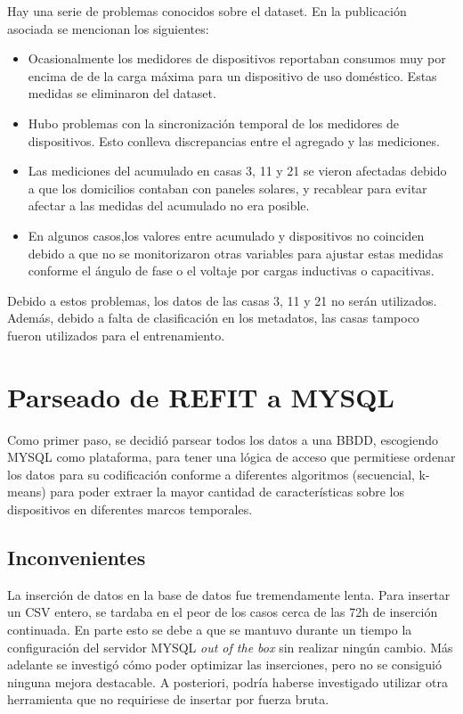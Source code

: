 Hay una serie de problemas conocidos sobre el dataset. En la publicación asociada se mencionan los siguientes:
\begin{itemize}
    \item Ocasionalmente los medidores de dispositivos reportaban consumos muy por encima de de la carga máxima para un dispositivo de uso doméstico. Estas medidas se eliminaron del dataset.
    \item Hubo problemas con la sincronización temporal de los medidores de dispositivos. Esto conlleva discrepancias entre el agregado y las mediciones.
    \item Las mediciones del acumulado en casas 3, 11 y 21 se vieron afectadas debido a que los domicilios contaban con paneles solares, y recablear para evitar afectar a las medidas del acumulado no era posible.
    \item En algunos casos,los valores entre acumulado y dispositivos no coinciden debido a que no se monitorizaron otras variables para ajustar estas medidas conforme el ángulo de fase o el voltaje por cargas inductivas o capacitivas.
\end{itemize}

Debido a estos problemas, los datos de las casas 3, 11 y 21 no serán utilizados. Además, debido a falta de clasificación en los metadatos, las casas  tampoco fueron utilizados para el entrenamiento.

\section{Parseado de REFIT a MYSQL}
Como primer paso, se decidió parsear todos los datos a una BBDD, escogiendo MYSQL como plataforma, para tener una lógica de acceso que permitiese ordenar los datos para su codificación conforme a diferentes algoritmos (secuencial, k-means) para poder extraer la mayor cantidad de características sobre los dispositivos en diferentes marcos temporales.

\subsection{Inconvenientes}
La inserción de datos en la base de datos fue tremendamente lenta. Para insertar un CSV entero, se tardaba en el peor de los casos cerca de las 72h de inserción continuada.
En parte esto se debe a que se mantuvo durante un tiempo la configuración del servidor MYSQL \textit{out of the box} sin realizar ningún cambio.
Más adelante se investigó cómo poder optimizar las inserciones, pero no se consiguió ninguna mejora destacable. A posteriori, podría haberse investigado utilizar otra herramienta que no requiriese de insertar por fuerza bruta.

